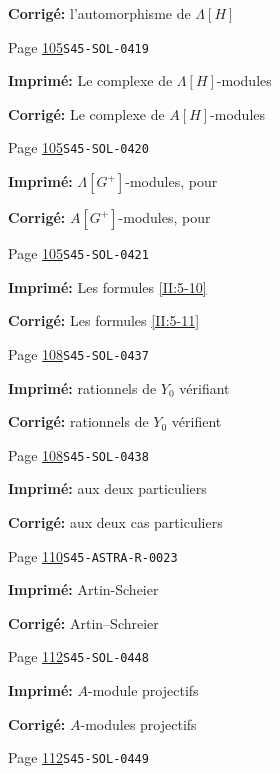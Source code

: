 \begin{description}
\par\noindent\textbf{Corrigé:} l'automorphisme de $\Lambda[H]$
\smallskip
\item[\hypertarget{apparatus:FR-0060}{60}] Page \hyperlink{printpage:fr:105}{105}\quad\texttt{S45-SOL-0419}
\par\noindent\textbf{Imprimé:} Le complexe de $\Lambda[H]$-modules
\par\noindent\textbf{Corrigé:} Le complexe de $A[H]$-modules
\smallskip
\item[\hypertarget{apparatus:FR-0061}{61}] Page \hyperlink{printpage:fr:105}{105}\quad\texttt{S45-SOL-0420}
\par\noindent\textbf{Imprimé:} $\Lambda[G^+]$-modules, pour
\par\noindent\textbf{Corrigé:} $A[G^+]$-modules, pour
\smallskip
\item[\hypertarget{apparatus:FR-0062}{62}] Page \hyperlink{printpage:fr:105}{105}\quad\texttt{S45-SOL-0421}
\par\noindent\textbf{Imprimé:} Les formules \ref{II:5-10}
\par\noindent\textbf{Corrigé:} Les formules \ref{II:5-11}
\smallskip
\item[\hypertarget{apparatus:FR-0063}{63}] Page \hyperlink{printpage:fr:108}{108}\quad\texttt{S45-SOL-0437}
\par\noindent\textbf{Imprimé:} rationnels de $Y_0$ vérifiant
\par\noindent\textbf{Corrigé:} rationnels de $Y_0$ vérifient
\smallskip
\item[\hypertarget{apparatus:FR-0064}{64}] Page \hyperlink{printpage:fr:108}{108}\quad\texttt{S45-SOL-0438}
\par\noindent\textbf{Imprimé:} aux deux particuliers
\par\noindent\textbf{Corrigé:} aux deux cas particuliers
\smallskip
\item[\hypertarget{apparatus:FR-0065}{65}] Page \hyperlink{printpage:fr:110}{110}\quad\texttt{S45-ASTRA-R-0023}
\par\noindent\textbf{Imprimé:} Artin-Scheier
\par\noindent\textbf{Corrigé:} Artin--Schreier
\smallskip
\item[\hypertarget{apparatus:FR-0066}{66}] Page \hyperlink{printpage:fr:112}{112}\quad\texttt{S45-SOL-0448}
\par\noindent\textbf{Imprimé:} $A$-module projectifs
\par\noindent\textbf{Corrigé:} $A$-modules projectifs
\smallskip
\item[\hypertarget{apparatus:FR-0067}{67}] Page \hyperlink{printpage:fr:112}{112}\quad\texttt{S45-SOL-0449}

\end{description}
